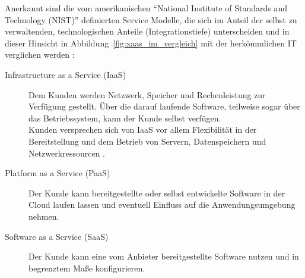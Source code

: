 Anerkannt sind die vom amerikanischen "`National Institute of Standards and Technology (NIST)"' definierten Service Modelle, die sich im Anteil der selbst zu verwaltenden, technologischen Anteile (Integrationstiefe)
unterscheiden und in dieser Hinsicht in Abbildung~\ref{fig:xaas_im_vergleich}
mit der herkömmlichen IT verglichen werden :
\begin{description}
	\item[Infrastructure as a Service (IaaS)] Dem Kunden werden Netzwerk,
Speicher und Rechenleistung zur Verfügung gestellt. Über die darauf laufende
Software, teilweise sogar über das Betriebssystem, kann der Kunde selbst verfügen. \\
Kunden versprechen sich von IaaS vor allem Flexibilität in der Bereitstellung
und dem Betrieb von Servern, Datenspeichern und Netzwerkressourcen .
	\item[Platform as a Service (PaaS)] Der Kunde kann bereitgestellte
oder selbst entwickelte Software in der Cloud laufen lassen und eventuell
Einfluss auf die Anwendungsumgebung nehmen. 
	\item[Software as a Service (SaaS)] Der Kunde kann eine vom Anbieter
bereitgestellte Software nutzen und in begrenztem Maße konfigurieren.
\end{description}


